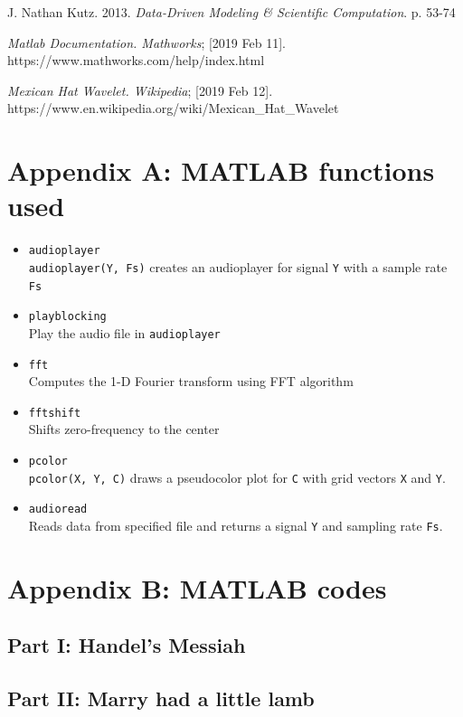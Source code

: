 \documentclass[10pt,a4paper]{article}
\numberwithin{equation}{subsection}
\begin{document}
\begin{thebibliography}{11}
	J. Nathan Kutz. 2013.
	\textit{Data-Driven Modeling \& Scientific Computation}. p. 53-74
	
	\textit{Matlab Documentation. Mathworks}; [2019 Feb 11]. \\https://www.mathworks.com/help/index.html

	\textit{Mexican Hat Wavelet. Wikipedia}; [2019 Feb 12]. \\https://www.en.wikipedia.org/wiki/Mexican\_Hat\_Wavelet	
\end{thebibliography}


\section*{Appendix A: MATLAB functions used}
	\begin{itemize}
		\item \texttt{audioplayer}\\
		\texttt{audioplayer(Y, Fs)} creates an audioplayer for signal \texttt{Y} with a sample rate \texttt{Fs}
		\item \texttt{playblocking}\\
		Play the audio file in \texttt{audioplayer}
		\item \texttt{fft}\\
		Computes the 1-D Fourier transform using FFT algorithm
		\item \texttt{fftshift}\\
		Shifts zero-frequency to the center
		\item \texttt{pcolor}\\
		\texttt{pcolor(X, Y, C)} draws a pseudocolor plot for \texttt{C} with grid vectors \texttt{X} and \texttt{Y}.
		\item \texttt{audioread}\\
		Reads data from specified file and returns a signal \texttt{Y} and 	sampling rate \texttt{Fs}.
	\end{itemize}


\section*{Appendix B: MATLAB codes}
\subsection*{Part I: Handel's Messiah}


\subsection*{Part II: Marry had a little lamb}

\end{document}
